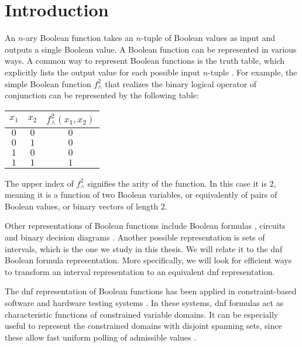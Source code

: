 \chapter*{Introduction}

An $n$-ary Boolean function takes an $n$-tuple of Boolean values as input
and outputs a single Boolean value.
A Boolean function can be represented in various ways.
A common way to represent Boolean functions
is the truth table,
which explicitly lists the output value for each possible input $n$-tuple \citep[Definition 1.2]{Crama2011}.
For example,
the simple Boolean function $f^2_{\wedge}$ that realizes the binary logical operator of conjunction
can be represented by the following table:
\begin{center}
\begin{tabular}{cc|c}
$x_1$ & $x_2$ & $f^2_{\wedge}(x_1, x_2)$ \\
\hline
$0$ & $0$ & $0$ \\
$0$ & $1$ & $0$ \\
$1$ & $0$ & $0$ \\
$1$ & $1$ & $1$ \\
\end{tabular}
\end{center}

The upper index of $f^2_{\wedge}$
signifies the arity of the function.
In this case it is $2$,
meaning it is a function of two Boolean variables,
or equivalently of pairs of Boolean values,
or binary vectors of length $2$.

Other representations of Boolean functions
include
Boolean formulas \citep[Definition 1.4]{Crama2011},
circuits
\citep[Definition 3.1]{Wegener1987}
and binary decision diagrams \citep[Section 1.12.3]{Crama2011}.
Another possible representation is sets of intervals,
which is the one we study in this thesis.
We will relate it to the \acrfull{dnf}
Boolean formula representation.
More specifically,
we will look for efficient ways to transform an interval representation
to an equivalent \acrshort{dnf} representation.

The \acrshort{dnf} representation of Boolean functions
has been applied in constraint-based software
and hardware
testing systems
\citep{DeMillo1991,Lewin1995}.
In these systems,
\acrshort{dnf} formulas act as characteristic functions
of constrained variable domains.
It can be especially useful to represent the constrained
domains with disjoint spanning sets,
since these allow fast uniform polling
of admissible values
\citep{Schieber2005154}.

